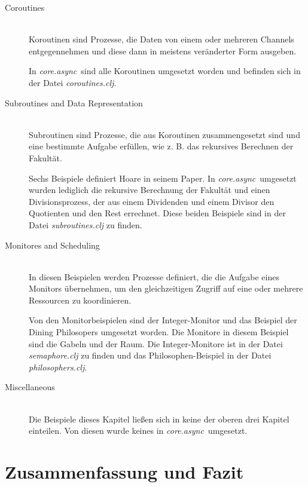 \documentclass[12pt,a4paper,parskip=half,listof=totoc]{scrreprt}
\newcommand{\CA}{\textit{core.async}}
\begin{document}
\begin{description}
\item[Coroutines]\hfill \\
Koroutinen sind Prozesse, die Daten von einem oder mehreren Channels entgegennehmen und diese dann in meistens veränderter Form ausgeben.

In \CA\ sind alle Koroutinen umgesetzt worden und befinden sich in der Datei \textit{coroutines.clj}.
\item[Subroutines and Data Representation]\hfill \\
Subroutinen sind Prozesse, die aus Koroutinen zusammengesetzt sind und eine bestimmte Aufgabe erfüllen, wie z. B. das rekursives Berechnen der Fakultät.

Sechs Beispiele definiert Hoare in seinem Paper. In \CA\ umgesetzt wurden lediglich die rekursive Berechnung der Fakultät und einen Divisionsprozess, der aus einem Dividenden und einem Divisor den Quotienten und den Rest errechnet. Diese beiden Beispiele sind in der Datei \textit{subroutines.clj} zu finden.
\item[Monitores and Scheduling] \hfill \\
In diesen Beispielen werden Prozesse definiert, die die Aufgabe eines Monitors übernehmen, um den gleichzeitigen Zugriff auf eine oder mehrere Ressourcen zu koordinieren.

Von den Monitorbeispielen sind der Integer-Monitor und das Beispiel der Dining Philosopers umgesetzt worden. Die Monitore in diesem Beispiel sind die Gabeln und der Raum. Die Integer-Monitore ist in der Datei \textit{semaphore.clj} zu finden und das Philosophen-Beispiel in der Datei \textit{philosophers.clj}.
\item[Miscellaneous] \hfill \\
Die Beispiele dieses Kapitel ließen sich in keine der oberen drei Kapitel einteilen. Von diesen wurde keines in \CA\ umgesetzt.
\end{description}

\section{Zusammenfassung und Fazit}
\end{document}
